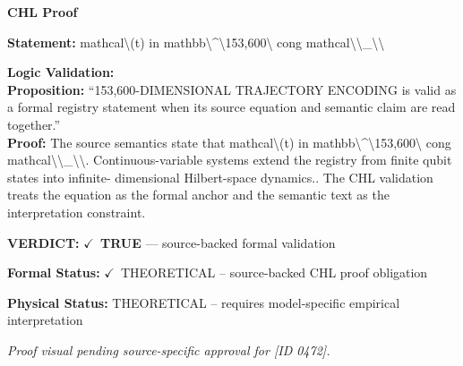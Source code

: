 \vspace{0.45em}
\noindent\textbf{CHL Proof}\par
\textbf{Statement:} mathcal\textbackslash{}(t) in mathbb\textbackslash{}\textasciicircum{}\textbackslash{}153,600\textbackslash{} cong mathcal\textbackslash{}\textbackslash{}\_\textbackslash{}\textbackslash{}

\textbf{Logic Validation:}\\
\textbf{Proposition:} ``153,600-DIMENSIONAL TRAJECTORY ENCODING is valid as a formal registry statement when its
source equation and semantic claim are read together.''\\
\textbf{Proof:} The source semantics state that mathcal\textbackslash{}(t) in mathbb\textbackslash{}\textasciicircum{}\textbackslash{}153,600\textbackslash{} cong mathcal\textbackslash{}\textbackslash{}\_\textbackslash{}\textbackslash{}.
Continuous-variable systems extend the registry from finite qubit states into infinite-
dimensional Hilbert-space dynamics.. The CHL validation treats the equation as the
formal anchor and the semantic text as the interpretation constraint.

\textbf{VERDICT:} \ensuremath{\checkmark}\ \textbf{TRUE} --- source-backed formal validation

\textbf{Formal Status:} \ensuremath{\checkmark}\ THEORETICAL -- source-backed CHL proof obligation

\textbf{Physical Status:} THEORETICAL -- requires model-specific empirical interpretation
\par\vspace{0.45em}
\par
\vfill
\begingroup\footnotesize\itshape
Proof visual pending source-specific approval for [ID 0472].
\par\endgroup
\vfill
\endgroup
\endgroup
